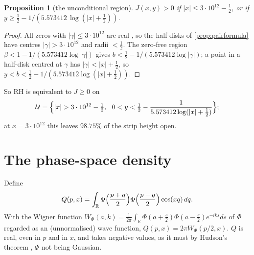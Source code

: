 \documentclass[11pt]{article}
\newtheorem{proposition}[theorem]{Proposition}
\theoremstyle{definition}\newtheorem{definition}[theorem]{Definition}
\theoremstyle{remark}\newtheorem{remark}[theorem]{Remark}
\newcommand{\R}{\mathbb R}\newcommand{\C}{\mathbb C}\newcommand{\N}{\mathbb N}
\begin{document}
\begin{proposition}[the unconditional region]\label{prop:region}
$J(x,y)>0$ if $|x|\le3\cdot10^{12}-\frac12$, or if $y\ge\frac12-1/(5.573412\,\log(|x|+\frac12))$.
\end{proposition}
\begin{proof}
All zeros with $|\gamma|\le3\cdot10^{12}$ are real \cite{PT}, so the half-disks of \cref{prop:pairformula} have centres $|\gamma|>3\cdot10^{12}$ and radii $<\frac12$. The zero-free region $\beta<1-1/(5.573412\log|\gamma|)$ \cite{MT} gives $b<\frac12-1/(5.573412\log|\gamma|)$; a point in a half-disk centred at $\gamma$ has $|\gamma|<|x|+\frac12$, so $y<b<\frac12-1/(5.573412\log(|x|+\frac12))$.
\end{proof}
So RH is equivalent to $J\ge0$ on
\[
\mathcal U=\Bigl\{|x|>3\cdot10^{12}-\tfrac12,\ \ 0<y<\tfrac12-\frac1{5.573412\log(|x|+\frac12)}\Bigr\};
\]
at $x=3\cdot10^{12}$ this leaves $98.75\%$ of the strip height open.

\section{The phase-space density}\label{sec:phase}
Define
\[
Q(p,x)=\int_\R\Phi\Bigl(\frac{p+q}2\Bigr)\Phi\Bigl(\frac{p-q}2\Bigr)\cos(xq)\,dq .
\]
With the Wigner function $W_\Phi(a,k)=\frac1{2\pi}\int_\R\Phi(a+\frac s2)\Phi(a-\frac s2)e^{-iks}ds$ of $\Phi$ regarded as an (unnormalised) wave function, $Q(p,x)=2\pi W_\Phi(p/2,x)$. $Q$ is real, even in $p$ and in $x$, and takes negative values, as it must by Hudson's theorem \cite{Hudson}, $\Phi$ not being Gaussian.
\end{document}
